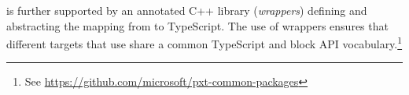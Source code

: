 
 \MC is further supported by an annotated C++ library (\emph{\MC wrappers}) defining and abstracting the mapping from \CO to TypeScript. The use of \MC wrappers ensures that different \MC targets that use \CO share a common TypeScript and block API vocabulary.\footnote{See \url{https://github.com/microsoft/pxt-common-packages}}





